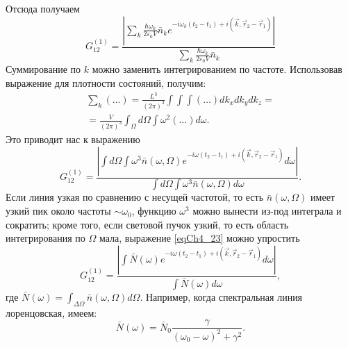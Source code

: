 Отсюда получаем
\begin{equation}
G_{12}^{(1)} = \frac{\left|
\sum_{k} 
\frac{\hbar \omega_k}{2 \varepsilon_0 V}
\bar{n}_k e^{-i \omega_k \left(t_2 - t_1\right) + 
i \left(\vec{k}, \vec{r}_2 - \vec{r}_1\right)}
\right|}{
\sum_{k}
\frac{\hbar \omega_k}{2 \varepsilon_0 V}
\bar{n}_k
}
\label{eqCh4_22}
\end{equation}
Суммирование по $k$ можно заменить интегрированием по
частоте. Использовав выражение для плотности состояний, получим: 
\begin{eqnarray}
\sum_{k}\left(\dots\right) = \frac{L^3}{\left(2 \pi\right)^3}
\int \int \int \left(\dots\right) d k_x d k_y d k_z =
\nonumber \\
= \frac{V}{\left(2 \pi\right)^3}
\int_{\Omega} d \Omega \int \omega^2 \left(\dots\right) d \omega.
\nonumber
\end{eqnarray}
Это приводит нас к выражению
\begin{equation}
G_{12}^{(1)} = \frac{\left|
\int d \Omega \int \omega^3 \bar{n}\left(\omega, \Omega\right) 
e^{-i \omega\left(t_2 - t_1\right) + i \left(\vec{k}, \vec{r}_2 -
  \vec{r}_1 \right)}
d \omega
\right|}{
\int d \Omega \int \omega^3 \bar{n}\left(\omega, \Omega\right) d \omega
}.
\label{eqCh4_23}
\end{equation}
Если линия узкая по сравнению с несущей частотой, то есть 
$\bar{n}\left(\omega, \Omega\right)$ имеет
узкий пик около частоты  $\sim \omega_0$,  функцию $\omega^3$ можно
вынести из-под интеграла и сократить; кроме того, если световой пучок узкий,
то есть область интегрирования по $\Omega$ мала, выражение
\eqref{eqCh4_23} можно упростить 
\begin{equation}
G_{12}^{(1)} = \frac{\left|
\int \bar{N}\left(\omega\right) 
e^{-i \omega\left(t_2 - t_1\right) + i \left(\vec{k}, \vec{r}_2 -
  \vec{r}_1 \right)}
d \omega
\right|}{
\int \bar{N}\left(\omega\right) d \omega
},
\label{eqCh4_24}
\end{equation}
где $\bar{N}\left(\omega\right) = \int_{\Delta \Omega}
\bar{n}\left(\omega, \Omega\right) d \Omega$.  Например, когда
спектральная линия лоренцовская, имеем:
\[
\bar{N}\left(\omega\right) = \bar{N}_0\frac{\gamma}{\left(\omega_0 -
  \omega\right)^2 + \gamma^2} .
\]  

